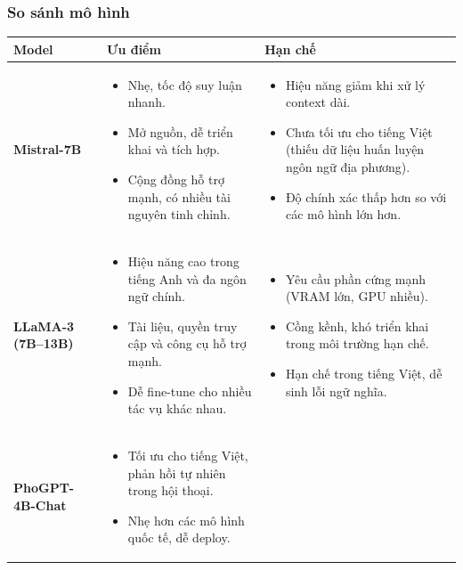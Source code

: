 \noindent

\subsubsection{So sánh mô hình}
\begin{center}
\renewcommand{\arraystretch}{1.3}
\begin{tabular}{|p{3cm}|p{6cm}|p{6cm}|}
\hline
\textbf{Model} & \textbf{Ưu điểm} & \textbf{Hạn chế} \\
\hline
\textbf{Mistral-7B} &
\begin{itemize}[leftmargin=*]
    \item Nhẹ, tốc độ suy luận nhanh.
    \item Mở nguồn, dễ triển khai và tích hợp.
    \item Cộng đồng hỗ trợ mạnh, có nhiều tài nguyên tinh chỉnh.
\end{itemize}
&
\begin{itemize}[leftmargin=*]
    \item Hiệu năng giảm khi xử lý context dài.
    \item Chưa tối ưu cho tiếng Việt (thiếu dữ liệu huấn luyện ngôn ngữ địa phương).
    \item Độ chính xác thấp hơn so với các mô hình lớn hơn.
\end{itemize}
\\
\hline
\textbf{LLaMA-3 (7B–13B)} &
\begin{itemize}[leftmargin=*]
    \item Hiệu năng cao trong tiếng Anh và đa ngôn ngữ chính.
    \item Tài liệu, quyền truy cập và công cụ hỗ trợ mạnh.
    \item Dễ fine-tune cho nhiều tác vụ khác nhau.
\end{itemize}
&
\begin{itemize}[leftmargin=*]
    \item Yêu cầu phần cứng mạnh (VRAM lớn, GPU nhiều).
    \item Cồng kềnh, khó triển khai trong môi trường hạn chế.
    \item Hạn chế trong tiếng Việt, dễ sinh lỗi ngữ nghĩa.
\end{itemize}
\\
\hline
\textbf{PhoGPT-4B-Chat} &
\begin{itemize}[leftmargin=*]
    \item Tối ưu cho tiếng Việt, phản hồi tự nhiên trong hội thoại.
    \item Nhẹ hơn các mô hình quốc tế, dễ deploy.

\end{itemize}
\end{tabular}
\end{center}
